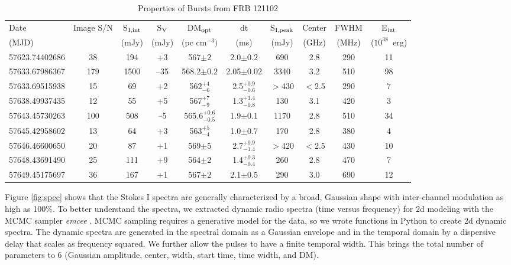 \documentclass[twocolumn]{aastex61}
\newcommand{\frb}{FRB 121102}
\begin{document}
\begin{table}
\caption{Properties of Bursts from \frb}
\centering
\begin{tabular}{l|ccc|cccccc}
\hline
Date                & Image S/N & S$_{\rm{I,int}}$	& S$_{\rm{V}}$ 	& DM$_{\rm{opt}}$ 	& dt 			& S$_{\rm{I,peak}}$ & Center & FWHM & E$_{\rm{int}}$ \\
(MJD)               &           & (mJy) 			& (mJy) 		& (pc cm$^{-3})$ 	& (ms) 			& (mJy) 			& (GHz)  & (MHz) & ($10^{38}$\ erg)\\ \hline
57623.74402686      & 38 		& 194				& +3			& 567$\pm2$ 		& 2.0$\pm0.2$	 		& 690 		& 2.8 		& 290 & 11 			\\
57633.67986367      & 179 		& 1500				& --35 			& 568.2$\pm0.2$ 	& 2.05$\pm0.02$			& 3340 		& 3.2 		& 510 & 98				\\
57633.69515938\tablenotemark{a} & 15 & 69			& +2			& 562$^{+4}_{-6}$ 	& 2.5$^{+0.9}_{-0.6}$	& $>$430 	& $<$2.5	& 290 & 7  			\\
57638.49937435      & 12 		& 55				& +5 			& 567$^{+7}_{-9}$ 	& 1.3$^{+1.4}_{-0.8}$	& 130 		& 3.1 		& 420 & 3  			\\
57643.45730263      & 100 		& 508				& --5 			& 565.6$^{+0.6}_{-0.5}$ & 1.9$\pm0.1$		& 1170 		& 2.8 		& 510 & 34 			\\
57645.42958602      & 13 		& 64 				& +3			& 563$^{+5}_{-4}$ 	& 1.0$\pm0.7$		 	& 170 		& 2.8 		& 380 & 4  			\\
57646.46600650\tablenotemark{a} & 20 & 87			& +1			& 569$\pm5$ 		& 2.7$^{+0.9}_{-1.4}$	& $>$420 	& $<$2.5 	& 430 & 10 			\\
57648.43691490\tablenotemark{b} & 25 & 111			& +9			& 564$\pm2$ 		& 1.4$^{+0.3}_{-0.4}$	& 260 		& 2.8 		& 470 & 7  			\\
57649.45175697      & 36 		& 167				& +1			& 567$\pm2$ 		& 2.1$\pm0.5$		 	& 290 		& 3.0 		& 690 & 12 			\\ \hline
\end{tabular}
\label{tab:spec}
\end{table} 

Figure \ref{fig:spec} shows that the Stokes I spectra are generally characterized by a broad, Gaussian shape with inter-channel modulation as high as 100\%. To better understand the spectra, we extracted dynamic radio spectra (time versus frequency) for 2d modeling with the MCMC sampler \emph{emcee} \citep{2013PASP..125..306F}. MCMC sampling requires a generative model for the data, so we wrote functions in Python to create 2d dynamic spectra. The dynamic spectra are generated in the spectral domain as a Gaussian envelope and in the temporal domain by a dispersive delay that scales as frequency squared. We further allow the pulses to have a finite temporal width. This brings the total number of parameters to 6 (Gaussian amplitude, center, width, start time, time width, and DM). 
\end{document}
